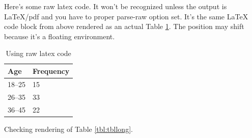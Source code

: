 \documentclass[\pandocDocMode,longtable,noextraspace,floatsintext]{apa6}
\begin{document}
Here's some raw latex code. It won't be recognized unless the output is
LaTeX/pdf and you have to proper parse-raw option set. It's the same
LaTeX code block from above rendered as an actual Table
\ref{tbl:rawtex}. The position may shift because it's a floating
environment.

\begin{table}
\centering
\caption{Using raw latex code}
\label{tbl:rawtex}
\begin{tabular}{|l|l|}\hline
Age & Frequency \\ \hline
18--25  & 15 \\
26--35  & 33 \\
36--45  & 22 \\ \hline
\end{tabular}
\end{table}

Checking rendering of Table \ref{tbl:tbllong}.
\end{document}
